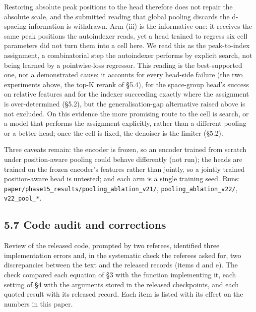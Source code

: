 \documentclass[
  11pt,
]{article}
\begin{document}
Restoring absolute peak positions to the head therefore does not repair
the absolute scale, and the submitted reading that global pooling
discards the d-spacing information is withdrawn. Arm (iii) is the
informative one: it receives the same peak positions the autoindexer
reads, yet a head trained to regress six cell parameters did not turn
them into a cell here. We read this as the peak-to-index assignment, a
combinatorial step the autoindexer performs by explicit search, not
being learned by a pointwise-loss regressor. This reading is the
best-supported one, not a demonstrated cause: it accounts for every
head-side failure (the two experiments above, the top-K rerank of §5.4),
for the space-group head's success on relative features and for the
indexer succeeding exactly where the assignment is over-determined
(§5.2), but the generalisation-gap alternative raised above is not
excluded. On this evidence the more promising route to the cell is
search, or a model that performs the assignment explicitly, rather than
a different pooling or a better head; once the cell is fixed, the
denoiser is the limiter (§5.2).

Three caveats remain: the encoder is frozen, so an encoder trained from
scratch under position-aware pooling could behave differently (not run);
the heads are trained on the frozen encoder's features rather than
jointly, so a jointly trained position-aware head is untested; and each
arm is a single training seed. Runs:
\texttt{paper/phase15\_results/pooling\_ablation\_v21/},
\texttt{pooling\_ablation\_v22/}, \texttt{v22\_pool\_*}.

\subsection{5.7 Code audit and
corrections}\label{code-audit-and-corrections}

Review of the released code, prompted by two referees, identified three
implementation errors and, in the systematic check the referees asked
for, two discrepancies between the text and the released records (items
d and e). The check compared each equation of §3 with the function
implementing it, each setting of §4 with the arguments stored in the
released checkpoints, and each quoted result with its released record.
Each item is listed with its effect on the numbers in this paper.
\end{document}
